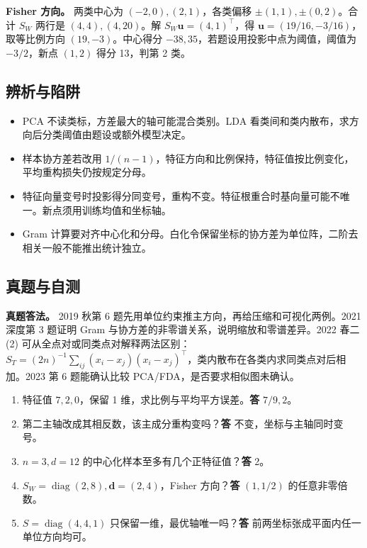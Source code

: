 \documentclass[UTF8,a4paper,zihao=-4,fontset=fandol]{ctexart}
\begin{document}
\textbf{Fisher 方向。} 两类中心为 \((-2,0),(2,1)\)，各类偏移 \(\pm(1,1),\pm(0,2)\)。合计 \(S_W\) 两行是 \((4,4),(4,20)\)。解 \(S_W\bm u=(4,1)^\top\)，得 \(\bm u=(19/16,-3/16)\)，取等比例方向 \((19,-3)\)。中心得分 \(-38,35\)，若题设用投影中点为阈值，阈值为 \(-3/2\)，新点 \((1,2)\) 得分 13，判第 2 类。

\subsection{辨析与陷阱}
\begin{itemize}[nosep,leftmargin=*]
\item PCA 不读类标，方差最大的轴可能混合类别。LDA 看类间和类内散布，求方向后分类阈值由题设或额外模型决定。
\item 样本协方差若改用 \(1/(n-1)\)，特征方向和比例保持，特征值按比例变化，平均重构损失仍按规定分母。
\item 特征向量变号时投影得分同变号，重构不变。特征根重合时基向量可能不唯一。新点须用训练均值和坐标轴。
\item Gram 计算要对齐中心化和分母。白化令保留坐标的协方差为单位阵，二阶去相关一般不能推出统计独立。
\end{itemize}

\subsection{真题与自测}
\textbf{真题答法。} 2019 秋第 6 题先用单位约束推主方向，再给压缩和可视化两例。2021 深度第 3 题证明 Gram 与协方差的非零谱关系，说明缩放和零谱差异。2022 春二(2) 可从全点对或同类点对解释两法区别：\(S_T=(2n)^{-1}\sum_{ij}(x_i-x_j)(x_i-x_j)^\top\)，类内散布在各类内求同类点对后相加。2023 第 6 题能确认比较 PCA/FDA，是否要求相似图未确认。
\begin{enumerate}[nosep,leftmargin=*]
\item 特征值 \(7,2,0\)，保留 1 维，求比例与平均平方误差。\textbf{答} \(7/9,2\)。
\item 第二主轴改成其相反数，该主成分重构变吗？\textbf{答} 不变，坐标与主轴同时变号。
\item \(n=3,d=12\) 的中心化样本至多有几个正特征值？\textbf{答} 2。
\item \(S_W=\operatorname{diag}(2,8),\bm d=(2,4)\)，Fisher 方向？\textbf{答} \((1,1/2)\) 的任意非零倍数。
\item \(S=\operatorname{diag}(4,4,1)\) 只保留一维，最优轴唯一吗？\textbf{答} 前两坐标张成平面内任一单位方向均可。
\end{enumerate}
\end{document}
